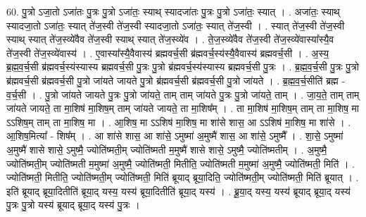 \documentclass[17pt]{extarticle}
\begin{document}
60. पु॒त्रो ऽजा॒तो ऽजा॑तः पु॒त्रः पु॒त्रो ऽजा॑तः॒ स्याथ् स्यादजा॑तः पु॒त्रः पु॒त्रो ऽजा॑तः॒ स्यात् । . अजा॑तः॒ स्याथ् स्यादजा॒तो ऽजा॑तः॒ स्यात् ते॑ज॒स्वी ते॑ज॒स्वी स्यादजा॒तो ऽजा॑तः॒ स्यात् ते॑ज॒स्वी । . स्यात् ते॑ज॒स्वी ते॑ज॒स्वी स्याथ् स्यात् ते॑ज॒स्व्ये॑वैव ते॑ज॒स्वी स्याथ् स्यात् ते॑ज॒स्व्ये॑व । . ते॒ज॒स्व्ये॑वैव ते॑ज॒स्वी ते॑ज॒स्व्ये॑वास्या᳚स्यै॒व ते॑ज॒स्वी ते॑ज॒स्व्ये॑वास्य॑ । . ए॒वास्या᳚स्यै॒वैवास्य॑ ब्रह्मवर्च॒सी ब्र॑ह्मवर्च॒स्य॑स्यै॒वैवास्य॑ ब्रह्मवर्च॒सी । . अ॒स्य॒ ब्र॒ह्म॒व॒र्च॒सी ब्र॑ह्मवर्च॒स्य॑स्यास्य ब्रह्मवर्च॒सी पु॒त्रः पु॒त्रो ब्र॑ह्मवर्च॒स्य॑स्यास्य ब्रह्मवर्च॒सी पु॒त्रः । . ब्र॒ह्म॒व॒र्च॒सी पु॒त्रः पु॒त्रो ब्र॑ह्मवर्च॒सी ब्र॑ह्मवर्च॒सी पु॒त्रो जा॑यते जायते पु॒त्रो ब्र॑ह्मवर्च॒सी ब्र॑ह्मवर्च॒सी पु॒त्रो जा॑यते । . ब्र॒ह्म॒व॒र्च॒सीति॑ ब्रह्म - व॒र्च॒सी । . पु॒त्रो जा॑यते जायते पु॒त्रः पु॒त्रो जा॑यते॒ ताम् ताम् जा॑यते पु॒त्रः पु॒त्रो जा॑यते॒ ताम् । . जा॒य॒ते॒ ताम् ताम् जा॑यते जायते॒ ता मा॒शिष॑ मा॒शिष॒म् ताम् जा॑यते जायते॒ ता मा॒शिष᳚म् । . ता मा॒शिष॑ मा॒शिष॒म् ताम् ता मा॒शिष॒ मा ऽऽशिष॒म् ताम् ता मा॒शिष॒ मा । . आ॒शिष॒ मा ऽऽशिष॑ मा॒शिष॒ मा शा॑से शास॒ आ ऽऽशिष॑ मा॒शिष॒ मा शा॑से । . आ॒शिष॒मित्या᳚ - शिष᳚म् । . आ शा॑से शास॒ आ शा॑से॒ ऽमुष्मा॑ अ॒मुष्मै॑ शास॒ आ शा॑से॒ ऽमुष्मै᳚ । . शा॒से॒ ऽमुष्मा॑ अ॒मुष्मै॑ शासे शासे॒ ऽमुष्मै॒ ज्योति॑ष्मती॒म् ज्योति॑ष्मती म॒मुष्मै॑ शासे शासे॒ ऽमुष्मै॒ ज्योति॑ष्मतीम् । . अ॒मुष्मै॒ ज्योति॑ष्मती॒म् ज्योति॑ष्मती म॒मुष्मा॑ अ॒मुष्मै॒ ज्योति॑ष्मती॒ मितीति॒ ज्योति॑ष्मती म॒मुष्मा॑ अ॒मुष्मै॒ ज्योति॑ष्मती॒ मिति॑ । . ज्योति॑ष्मती॒ मितीति॒ ज्योति॑ष्मती॒म् ज्योति॑ष्मती॒ मिति॑ ब्रूयाद् ब्रूया॒दिति॒ ज्योति॑ष्मती॒म् ज्योति॑ष्मती॒ मिति॑ ब्रूयात् । . इति॑ ब्रूयाद् ब्रूया॒दितीति॑ ब्रूया॒द् यस्य॒ यस्य॑ ब्रूया॒दितीति॑ ब्रूया॒द् यस्य॑ । . ब्रू॒या॒द् यस्य॒ यस्य॑ ब्रूयाद् ब्रूया॒द् यस्य॑ पु॒त्रः पु॒त्रो यस्य॑ ब्रूयाद् ब्रूया॒द् यस्य॑ पु॒त्रः । \newline
\end{document}
